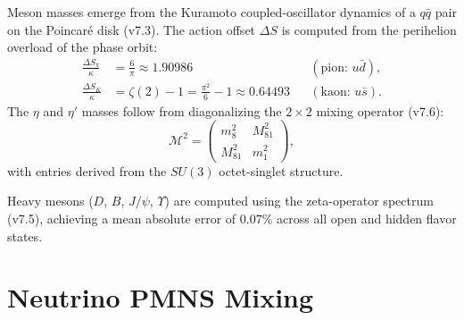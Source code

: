\documentclass[aps,prd,reprint,twocolumn,showpacs,superscriptaddress]{revtex4-2}
\begin{document}
Meson masses emerge from the Kuramoto coupled-oscillator dynamics of a
$q\bar{q}$ pair on the Poincar\'{e} disk (v7.3).  The action offset
$\Delta S$ is computed from the perihelion overload of the phase orbit:
\begin{align}
\frac{\Delta S_\pi}{\kappa} &= \frac{6}{\pi}
    \approx 1.90986
    &&(\text{pion: } u\bar{d}), \\
\frac{\Delta S_K}{\kappa} &= \zeta(2) - 1
    = \frac{\pi^2}{6} - 1
    \approx 0.64493
    &&(\text{kaon: } u\bar{s}).
\end{align}
The $\eta$ and $\eta'$ masses follow from diagonalizing the
$2 \times 2$ mixing operator (v7.6):
\begin{equation}
\mathcal{M}^2 =
\begin{pmatrix}
m_8^2 & M_{81}^2 \\
M_{81}^2 & m_1^2
\end{pmatrix},
\end{equation}
with entries derived from the $SU(3)$ octet-singlet structure.

Heavy mesons ($D$, $B$, $J/\psi$, $\Upsilon$) are computed using the
zeta-operator spectrum (v7.5), achieving a mean absolute error of
$0.07\%$ across all open and hidden flavor states.

\section{Neutrino PMNS Mixing}
\label{sec:neutrinos}
\end{document}
